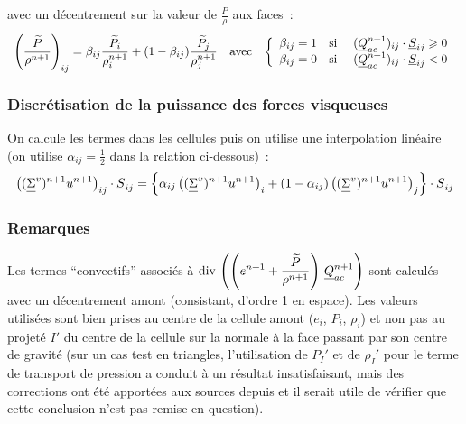 avec un décentrement sur la valeur de
$\displaystyle\frac{P}{\rho}$ aux faces~:
\begin{equation}
\begin{array}{lll}
\left(\displaystyle\frac{\widetilde{P}}{\rho^{n+1}}\right)_{ij}
 = \beta_{ij}\displaystyle\frac{\widetilde{P}_i}{\rho^{n+1}_i}
+ (1-\beta_{ij})\displaystyle\frac{\widetilde{P}_j}{\rho^{n+1}_j}
& \text{avec}
& \left\{\begin{array}{lll}
\beta_{ij} = 1 & \text{si\ }
& (\underline{Q}_{ac}^{n+1})_{ij} \cdot \underline{S}_{ij} \geqslant 0 \\
\beta_{ij} = 0 & \text{si\ }
& (\underline{Q}_{ac}^{n+1})_{ij} \cdot \underline{S}_{ij} < 0 \\
\end{array}\right.
\end{array}
\end{equation}



\subsubsection*{Discrétisation de la puissance des forces visqueuses}

On calcule les termes dans les cellules puis on utilise une
interpolation linéaire (on utilise
$\alpha_{ij}=\frac{1}{2}$ dans la relation ci-dessous)~:
\begin{equation}
\left((\underline{\underline{\Sigma}}^v)^{n+1} \underline{u}^{n+1} \right)_{ij}\cdot \underline{S}_{ij}
= \left\{\alpha_{ij} \left((\underline{\underline{\Sigma}}^v)^{n+1} \underline{u}^{n+1}\right)_i
+ (1-\alpha_{ij}) \left((\underline{\underline{\Sigma}}^v)^{n+1} \underline{u}^{n+1}\right)_j
\right\} \cdot \underline{S}_{ij}
\end{equation}


\subsubsection*{Remarques}


Les termes ``convectifs'' associés à
$\displaystyle\text{div}\,\left(\left(e^{n+1}+\frac{\widetilde{P}}{\rho^{n+1}}\right)\,
\underline{Q}_{ac}^{n+1}\right)$ sont calculés avec un décentrement amont
(consistant, d'ordre 1 en espace). Les valeurs utilisées sont bien prises au
centre de la cellule amont ($e_i$, $P_i$, $\rho_i$) et non pas au projeté $I'$
du centre de la cellule sur la normale à la face passant par son centre de
gravité (sur un cas test en triangles, l'utilisation de $P_I'$ et de $\rho_I'$
pour le terme de transport de pression a conduit à un résultat
insatisfaisant, mais des corrections ont été apportées aux sources depuis
et il serait utile de vérifier que cette conclusion n'est pas remise en question).

